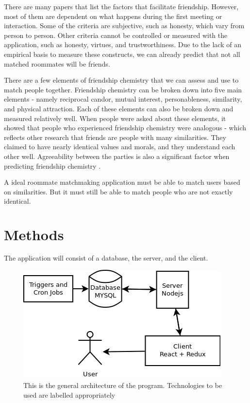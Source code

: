 \documentclass[journal]{./IEEE/IEEEtran}
\begin{document}
There are many papers that list the factors that facilitate friendship. However, most of them are dependent on what happens during the first meeting or interaction. Some of the criteria are subjective, such as honesty, which  vary from person to person. Other criteria cannot be controlled or measured with the application, such as honesty, virtues, and trustworthiness. Due to the lack of an empirical basis to measure these constructs, we can already predict that not all matched roommates will be friends.

There are a few elements of friendship chemistry that we can assess and use to match people together. Friendship chemistry can be broken down into five main elements - namely reciprocal candor, mutual interest, personableness, similarity, and physical attraction\cite{f_chemistry}. Each of these elements can also be broken down and measured relatively well. When people were asked about these elements, it showed that people who experienced friendship chemistry were analogous\cite{f_chemistry} - which reflects other research that friends are people with many similarities\cite{similar}. They claimed to have nearly identical values and morals, and they understand each other well\cite{f_chemistry}. Agreeability between the parties is also a significant factor when predicting friendship chemistry \cite{f_chemistry}.

A ideal roommate matchmaking application must be able to match users based on similarities. But it must still be able to match people who are not exactly identical.

\section{Methods}
The application will consist of a database, the server, and the client. \\

\begin{figure}[h]
\centering
\includegraphics[scale=0.5]{Architecture}
\caption{This is the general architecture of the program. Technologies to be used are labelled appropriately}
\end{figure}
\end{document}
